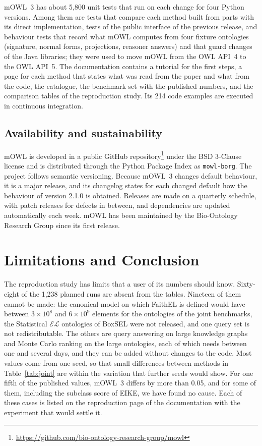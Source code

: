 \documentclass[runningheads]{llncs}
\newcommand{\EL}{\ensuremath{\mathcal{EL}}}
\begin{document}
mOWL~3 has about 5,800 unit tests that run on each change for four Python versions.
Among them are tests that compare each method built from parts with its direct
implementation, tests of the public interface of the previous release, and behaviour
tests that record what mOWL computes from four fixture ontologies (signature, normal
forms, projections, reasoner answers) and that guard changes of the Java libraries; they
were used to move mOWL from the OWL API~4 to the OWL API~5. The documentation contains a
tutorial for the first steps, a page for each method that states what was read from the
paper and what from the code, the catalogue, the benchmark set with the published
numbers, and the comparison tables of the reproduction study. Its 214 code examples are
executed in continuous integration.

\subsection{Availability and sustainability}

mOWL is developed in a public GitHub repository\footnote{\url{https://github.com/bio-ontology-research-group/mowl}}
under the BSD 3-Clause license and is distributed through the Python Package Index as \texttt{mowl-borg}.
 The project follows semantic versioning.
Because mOWL~3 changes default behaviour, it is a major release, and its changelog states
for each changed default how the behaviour of version 2.1.0 is obtained. Releases are
made on a quarterly schedule, with patch releases for defects in between, and
dependencies are updated automatically each week. mOWL has been maintained by the
Bio-Ontology Research Group since its first release. 

\section{Limitations and Conclusion}\label{sec:limits}

The reproduction study has limits that a user of its numbers should know. Sixty-eight of
the 1,238 planned runs are absent from the tables. Nineteen of them cannot be made:
the canonical model on which FaithEL is defined would have between $3 \times 10^8$ and
$6 \times 10^9$ elements for the ontologies of the joint benchmarks, the Statistical
\EL{} ontologies of BoxSEL were not released, and one query set is not redistributable.
The others are query answering on large knowledge graphs and Monte Carlo ranking on the
large ontologies, each of which needs between one and several days, and they can be added
without changes to the code. Most values come from one seed, so that small differences
between methods in Table~\ref{tab:joint} are within the variation that further seeds
would show. For one fifth of the published values, mOWL~3 differs by more than 0.05, and
for some of them, including the subclass score of EIKE, we have found no cause. Each of
these cases is listed on the reproduction page of the documentation with the experiment
that would settle it.
\end{document}
